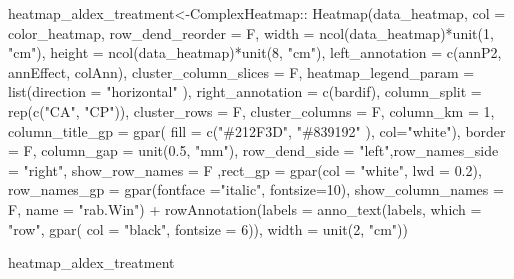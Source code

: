 \documentclass[]{interact}
\theoremstyle{plain}%
\theoremstyle{definition}
\theoremstyle{remark}
\newenvironment{Shaded}{\begin{snugshade}}{\end{snugshade}}
\newcommand{\AttributeTok}[1]{\textcolor[rgb]{0.77,0.63,0.00}{#1}}
\newcommand{\DecValTok}[1]{\textcolor[rgb]{0.00,0.00,0.81}{#1}}
\newcommand{\FloatTok}[1]{\textcolor[rgb]{0.00,0.00,0.81}{#1}}
\newcommand{\FunctionTok}[1]{\textcolor[rgb]{0.00,0.00,0.00}{#1}}
\newcommand{\NormalTok}[1]{#1}
\newcommand{\OtherTok}[1]{\textcolor[rgb]{0.56,0.35,0.01}{#1}}
\newcommand{\SpecialCharTok}[1]{\textcolor[rgb]{0.00,0.00,0.00}{#1}}
\newcommand{\StringTok}[1]{\textcolor[rgb]{0.31,0.60,0.02}{#1}}
\begin{document}
\begin{Shaded}
\begin{Highlighting}[]
\NormalTok{heatmap\_aldex\_treatment}\OtherTok{\textless{}{-}}\NormalTok{ComplexHeatmap}\SpecialCharTok{::}  \FunctionTok{Heatmap}\NormalTok{(data\_heatmap, }\AttributeTok{col =}\NormalTok{ color\_heatmap, }\AttributeTok{row\_dend\_reorder =}\NormalTok{ F, }\AttributeTok{width =} \FunctionTok{ncol}\NormalTok{(data\_heatmap)}\SpecialCharTok{*}\FunctionTok{unit}\NormalTok{(}\DecValTok{1}\NormalTok{, }\StringTok{"cm"}\NormalTok{),}
\AttributeTok{height =} \FunctionTok{ncol}\NormalTok{(data\_heatmap)}\SpecialCharTok{*}\FunctionTok{unit}\NormalTok{(}\DecValTok{8}\NormalTok{, }\StringTok{"cm"}\NormalTok{),}
\AttributeTok{left\_annotation =}  \FunctionTok{c}\NormalTok{(annP2, annEffect, colAnn),}
\AttributeTok{cluster\_column\_slices =}\NormalTok{ F,}
 \AttributeTok{heatmap\_legend\_param =} \FunctionTok{list}\NormalTok{(}\AttributeTok{direction =} \StringTok{"horizontal"}\NormalTok{ ),}
\AttributeTok{right\_annotation =} \FunctionTok{c}\NormalTok{(bardif),}
\AttributeTok{column\_split =} \FunctionTok{rep}\NormalTok{(}\FunctionTok{c}\NormalTok{(}\StringTok{"CA"}\NormalTok{, }\StringTok{"CP"}\NormalTok{)),}
\AttributeTok{cluster\_rows =}\NormalTok{ F,}
\AttributeTok{cluster\_columns =}\NormalTok{ F,}
\AttributeTok{column\_km =} \DecValTok{1}\NormalTok{, }\AttributeTok{column\_title\_gp =} \FunctionTok{gpar}\NormalTok{(}
\AttributeTok{fill =} \FunctionTok{c}\NormalTok{(}\StringTok{"\#212F3D"}\NormalTok{, }\StringTok{"\#839192"}\NormalTok{ ), }\AttributeTok{col=}\StringTok{"white"}\NormalTok{),}
\AttributeTok{border =}\NormalTok{ F, }\AttributeTok{column\_gap =} \FunctionTok{unit}\NormalTok{(}\FloatTok{0.5}\NormalTok{, }\StringTok{"mm"}\NormalTok{), }
\AttributeTok{row\_dend\_side =} \StringTok{"left"}\NormalTok{,}\AttributeTok{row\_names\_side =} \StringTok{"right"}\NormalTok{,}
\AttributeTok{show\_row\_names =}\NormalTok{ F ,}\AttributeTok{rect\_gp =} \FunctionTok{gpar}\NormalTok{(}\AttributeTok{col =} \StringTok{"white"}\NormalTok{, }\AttributeTok{lwd =} \FloatTok{0.2}\NormalTok{), }
\AttributeTok{row\_names\_gp =} \FunctionTok{gpar}\NormalTok{(}\AttributeTok{fontface =}\StringTok{"italic"}\NormalTok{, }\AttributeTok{fontsize=}\DecValTok{10}\NormalTok{),}
\AttributeTok{show\_column\_names =}\NormalTok{ F, }\AttributeTok{name =} \StringTok{"rab.Win"}\NormalTok{) }\SpecialCharTok{+} 
\FunctionTok{rowAnnotation}\NormalTok{(}\AttributeTok{labels =} \FunctionTok{anno\_text}\NormalTok{(labels, }\AttributeTok{which =} \StringTok{"row"}\NormalTok{, }\FunctionTok{gpar}\NormalTok{(}
  \AttributeTok{col =} \StringTok{"black"}\NormalTok{, }\AttributeTok{fontsize =} \DecValTok{6}\NormalTok{)), }\AttributeTok{width =} \FunctionTok{unit}\NormalTok{(}\DecValTok{2}\NormalTok{, }\StringTok{"cm"}\NormalTok{))}

\NormalTok{heatmap\_aldex\_treatment}
\end{Highlighting}
\end{Shaded}
\end{document}
